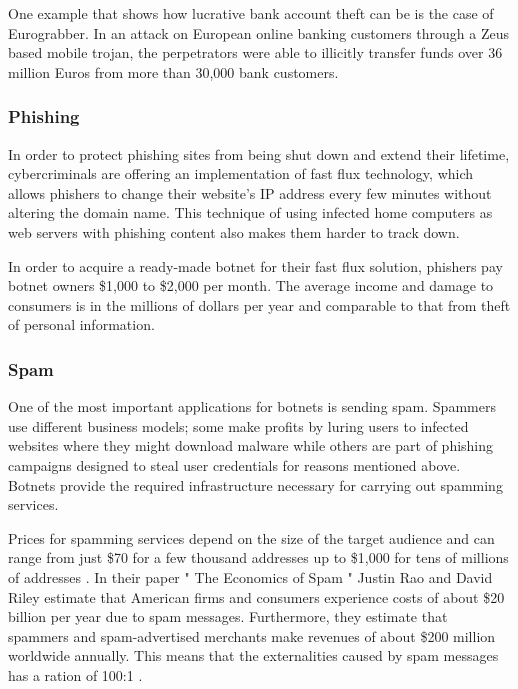 One example that shows how lucrative bank account theft can be is the case of Eurograbber. In an attack on European online banking customers through a Zeus based mobile trojan, the perpetrators were able to illicitly transfer funds over 36 million Euros from more than 30,000 bank customers. \cite{Kalige12}

		\subsubsection{Phishing}
		In order to protect phishing sites from being shut down and extend their lifetime, cybercriminals are offering an implementation of fast flux technology, which allows phishers to change their website's IP address every few minutes without altering the domain name. This technique of using infected home computers as web servers with phishing content also makes them harder to track down. \cite{Namestnikov09}

In order to acquire a ready-made botnet for their fast flux solution, phishers pay botnet owners \$1,000 to \$2,000 per month. The average income and damage to consumers is in the millions of dollars per year and comparable to that from theft of personal information. \cite{Namestnikov09}

		\subsubsection{Spam}
		One of the most important applications for botnets is sending spam. Spammers use different business models; some make profits by luring users to infected websites where they might download malware while others are part of phishing campaigns designed to steal user credentials for reasons mentioned above. Botnets provide the required infrastructure necessary for carrying out spamming services. \cite{Bailey09}

Prices for spamming services depend on the size of the target audience and can range from just \$70 for a few thousand addresses up to \$1,000 for tens of millions of addresses \cite{Namestnikov09}. In their paper " The Economics of Spam " Justin Rao and David Riley \cite{Rao12} estimate that American firms and consumers experience costs of about \$20 billion per year due to spam messages. Furthermore, they estimate that spammers and spam-advertised merchants make revenues of about \$200 million worldwide annually. This means that the externalities caused by spam messages has a ration of 100:1 \cite{Rao12}.

